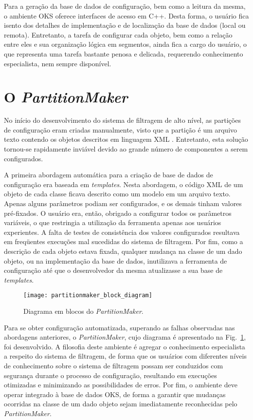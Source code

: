 Para a geração da base de dados de configuração, bem como a leitura da mesma, o ambiente OKS oferece interfaces de acesso em C++. Desta forma, o usuário fica isento dos detalhes de implementação e de localização da base de dados (local ou remota). Entretanto, a tarefa de configurar cada objeto, bem como a relação entre eles e sua organização lógica em segmentos, ainda fica a cargo do usuário, o que representa uma tarefa bastante penosa e delicada, requerendo conhecimento especialista, nem sempre disponível.


\section{O \emph{PartitionMaker}}
\label{sec:pm}

No início do desenvolvimento do sistema de filtragem de alto nível, as partições de configuração eram criadas manualmente, visto que a partição é um arquivo texto contendo os objetos descritos em linguagem XML \cite{bib:xml}. Entretanto, esta solução tornou-se rapidamente inviável devido ao grande número de componentes a serem configurados.

A primeira abordagem automática para a criação de base de dados de configuração era baseada em \emph{templates}. Nesta abordagem, o código XML de um objeto de cada classe ficava descrito como um modelo em um arquivo texto. Apenas alguns parâmetros podiam ser configurados, e os demais tinham valores pré-fixados. O usuário era, então, obrigado a configurar todos os parâmetros variáveis, o que restringia a utilização da ferramenta apenas aos usuários experientes. A falta de testes de consistência dos valores configurados resultava em freqüentes execuções mal sucedidas do sistema de filtragem. Por fim, como a descrição de cada objeto estava fixada, qualquer mudança na classe de um dado objeto, ou na implementação da base de dados, inutilizava a ferramenta de configuração até que o desenvolvedor da mesma atualizasse a sua base de \emph{templates}.

\begin{figure}
\begin{center}
\texttt{[image: partitionmaker\_block\_diagram]}
\caption{Diagrama em blocos do \emph{PartitionMaker}.}
\label{fig:pm}
\end{center}
\end{figure}

Para se obter configuração automatizada, superando as falhas observadas nas abordagens anteriores, o \emph{PartitionMaker}, cujo diagrama é apresentado na Fig.~\ref{fig:pm}, foi desenvolvido. A filosofia deste ambiente é agregar o conhecimento especialista a respeito do sistema de filtragem, de forma que os usuários com diferentes níveis de conhecimento sobre o sistema de filtragem possam ser conduzidos com segurança durante o processo de configuração, resultando em execuções otimizadas e minimizando as possibilidades de erros. Por fim, o ambiente deve operar integrado à base de dados OKS, de forma a garantir que mudanças ocorridas na classe de um dado objeto sejam imediatamente reconhecidas pelo \emph{PartitionMaker}.

